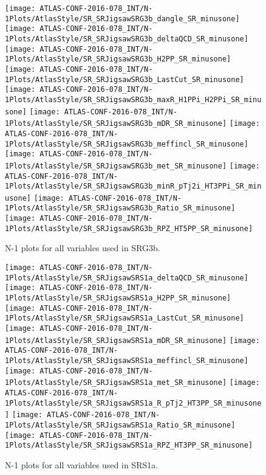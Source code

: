 \begin{figure}[tbp]
\begin{center}
\texttt{[image: ATLAS-CONF-2016-078\_INT/N-1Plots/AtlasStyle/SR\_SRJigsawSRG3b\_dangle\_SR\_minusone]}
\texttt{[image: ATLAS-CONF-2016-078\_INT/N-1Plots/AtlasStyle/SR\_SRJigsawSRG3b\_deltaQCD\_SR\_minusone]}
\texttt{[image: ATLAS-CONF-2016-078\_INT/N-1Plots/AtlasStyle/SR\_SRJigsawSRG3b\_H2PP\_SR\_minusone]}
\texttt{[image: ATLAS-CONF-2016-078\_INT/N-1Plots/AtlasStyle/SR\_SRJigsawSRG3b\_LastCut\_SR\_minusone]}
\texttt{[image: ATLAS-CONF-2016-078\_INT/N-1Plots/AtlasStyle/SR\_SRJigsawSRG3b\_maxR\_H1PPi\_H2PPi\_SR\_minusone]}
\texttt{[image: ATLAS-CONF-2016-078\_INT/N-1Plots/AtlasStyle/SR\_SRJigsawSRG3b\_mDR\_SR\_minusone]}
\texttt{[image: ATLAS-CONF-2016-078\_INT/N-1Plots/AtlasStyle/SR\_SRJigsawSRG3b\_meffincl\_SR\_minusone]}
\texttt{[image: ATLAS-CONF-2016-078\_INT/N-1Plots/AtlasStyle/SR\_SRJigsawSRG3b\_met\_SR\_minusone]}
\texttt{[image: ATLAS-CONF-2016-078\_INT/N-1Plots/AtlasStyle/SR\_SRJigsawSRG3b\_minR\_pTj2i\_HT3PPi\_SR\_minusone]}
\texttt{[image: ATLAS-CONF-2016-078\_INT/N-1Plots/AtlasStyle/SR\_SRJigsawSRG3b\_Ratio\_SR\_minusone]}
\texttt{[image: ATLAS-CONF-2016-078\_INT/N-1Plots/AtlasStyle/SR\_SRJigsawSRG3b\_RPZ\_HT5PP\_SR\_minusone]}
\end{center}
\caption{N-1 plots for all variables used in SRG3b.}
\label{fig:SR_SRJigsawSRG3a_minR_pTj2i_HT3PPi_SR_minusone}
\end{figure}
\clearpage

\begin{figure}[tbp]
\begin{center}
\texttt{[image: ATLAS-CONF-2016-078\_INT/N-1Plots/AtlasStyle/SR\_SRJigsawSRS1a\_deltaQCD\_SR\_minusone]}
\texttt{[image: ATLAS-CONF-2016-078\_INT/N-1Plots/AtlasStyle/SR\_SRJigsawSRS1a\_H2PP\_SR\_minusone]}
\texttt{[image: ATLAS-CONF-2016-078\_INT/N-1Plots/AtlasStyle/SR\_SRJigsawSRS1a\_LastCut\_SR\_minusone]}
\texttt{[image: ATLAS-CONF-2016-078\_INT/N-1Plots/AtlasStyle/SR\_SRJigsawSRS1a\_mDR\_SR\_minusone]}
\texttt{[image: ATLAS-CONF-2016-078\_INT/N-1Plots/AtlasStyle/SR\_SRJigsawSRS1a\_meffincl\_SR\_minusone]}
\texttt{[image: ATLAS-CONF-2016-078\_INT/N-1Plots/AtlasStyle/SR\_SRJigsawSRS1a\_met\_SR\_minusone]}
\texttt{[image: ATLAS-CONF-2016-078\_INT/N-1Plots/AtlasStyle/SR\_SRJigsawSRS1a\_R\_pTj2\_HT3PP\_SR\_minusone]}
\texttt{[image: ATLAS-CONF-2016-078\_INT/N-1Plots/AtlasStyle/SR\_SRJigsawSRS1a\_Ratio\_SR\_minusone]}
\texttt{[image: ATLAS-CONF-2016-078\_INT/N-1Plots/AtlasStyle/SR\_SRJigsawSRS1a\_RPZ\_HT3PP\_SR\_minusone]}
\end{center}
\caption{N-1 plots for all variables used in SRS1a.}
\label{fig:SR_SRJigsawSRG3b_Ratio_SR_minusone}
\end{figure}

